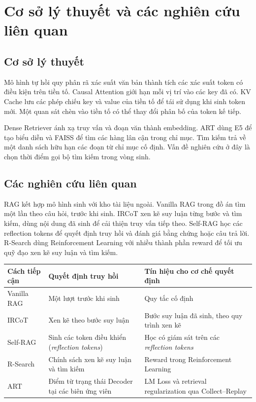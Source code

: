 \chapter{Cơ sở lý thuyết và các nghiên cứu liên quan}
\label{chap:background}
\section{Cơ sở lý thuyết}
Mô hình tự hồi quy phân rã xác suất văn bản thành tích các xác suất token có điều kiện trên tiền tố. Causal Attention giới hạn mỗi vị trí vào các key đã có. KV Cache lưu các phép chiếu key và value của tiền tố để tái sử dụng khi sinh token mới. Một quan sát chèn vào tiền tố có thể thay đổi phân bố của token kế tiếp.

Dense Retriever ánh xạ truy vấn và đoạn văn thành embedding. ART dùng E5 để tạo biểu diễn và FAISS để tìm các hàng lân cận trong chỉ mục. Tìm kiếm trả về một danh sách hữu hạn các đoạn từ chỉ mục cố định. Vấn đề nghiên cứu ở đây là chọn thời điểm gọi bộ tìm kiếm trong vòng sinh.

\section{Các nghiên cứu liên quan}
RAG kết hợp mô hình sinh với kho tài liệu ngoài\cite{rag}. Vanilla RAG trong đồ án tìm một lần theo câu hỏi, trước khi sinh. IRCoT xen kẽ suy luận từng bước và tìm kiếm, dùng nội dung đã sinh để cải thiện truy vấn tiếp theo\cite{ircot}. Self-RAG học các reflection tokens để quyết định truy hồi và đánh giá bằng chứng hoặc câu trả lời\cite{selfrag}. R-Search dùng Reinforcement Learning với nhiều thành phần reward để tối ưu quỹ đạo xen kẽ suy luận và tìm kiếm\cite{rsearch}.

\begin{center}\begin{minipage}{\linewidth}\centering
\captionsetup{hypcap=false}
\label{tab:signals}
\begin{tabularx}{\linewidth}{@{}p{2.5cm}XX@{}}
\toprule
Cách tiếp cận & Quyết định truy hồi & Tín hiệu cho cơ chế quyết định \\
\midrule
Vanilla RAG & Một lượt trước khi sinh & Quy tắc cố định \\
IRCoT & Xen kẽ theo bước suy luận & Bước suy luận đã sinh, theo quy trình xen kẽ \\
Self-RAG & Sinh các token điều khiển (\emph{reflection tokens}) & Học có giám sát trên các \emph{reflection tokens} \\
R-Search & Chính sách xen kẽ suy luận và tìm kiếm & Reward trong Reinforcement Learning \\
ART & Điểm từ trạng thái Decoder tại các biên ứng viên & LM Loss và retrieval regularization qua Collect--Replay \\
\bottomrule
\end{tabularx}
\end{minipage}\end{center}

